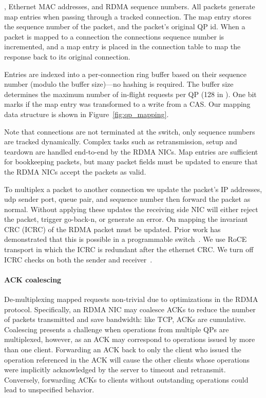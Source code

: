 , Ethernet MAC addresses, and
RDMA sequence numbers. All packets generate map entries when passing
through a tracked connection. The map entry stores the sequence number
of the packet, and the packet's original QP id. When a packet is
mapped to a connection the connections sequence number is incremented,
and a map entry is placed in the connection table to map the response
back to its original connection.

Entries are indexed into a per-connection ring buffer based on their
sequence number (modulo the buffer size)---no hashing is required.
The buffer size determines the maximum number of in-flight requests per
QP (128 in \sword). One bit marks if the map entry was transformed to
a write from a CAS. Our mapping data structure is shown in
Figure~\ref{fig:qp_mapping}.

Note that connections are not terminated at the switch, only sequence
numbers are tracked dynamically. Complex tasks such as retransmission,
setup and teardown are handled end-to-end by the RDMA NICs.
Map entries are sufficient for bookkeeping packets, but many
packet fields must be updated to ensure that the RDMA NICs
accept the packets as valid.

To multiplex a
packet to another connection we update the packet's IP
addresses, udp sender port, queue pair, and sequence number
then forward the packet as normal. Without applying these
updates the receiving side NIC will either reject the
packet, trigger go-back-n, or generate an error. 
%
On mapping the invariant CRC (ICRC) of the RDMA packet must
be updated. Prior work has demonstrated that this is
possible in a programmable switch~. We use RoCE
transport in which the ICRC is redundant after the ethernet
CRC. We turn off ICRC checks on both the sender and
receiver~\cite{switchml}.


\paragraph{ACK coalescing}
De-multiplexing mapped requests non-trivial due to optimizations in
the RDMA protocol. Specifically, an RDMA NIC may coalesce ACKs to
reduce the number of packets transmitted and save bandwidth: like TCP,
ACKs are cumulative. Coalescing presents a challenge when operations
from multiple QPs are multiplexed, however, as an ACK may correspond
to operations issued by more than one client.  Forwarding an ACK back
to only the client who issued the operation referenced in the ACK will
cause the other clients whose operations were implicitly acknowledged
by the server to timeout and retransmit.  Conversely, forwarding ACKs to
clients without outstanding operations could lead to unspecified
behavior.


